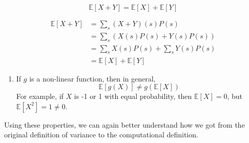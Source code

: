 \documentclass[
  letterpaper,
  DIV=11,
  numbers=noendperiod]{scrreprt}
\providecommand{\tightlist}{%
  \setlength{\itemsep}{0pt}\setlength{\parskip}{0pt}}\usepackage{longtable,booktabs,array}
\begin{document}
\[\mathbb{E}[X+Y] = \mathbb{E}[X] + \mathbb{E}[Y]\]

\begin{tcolorbox}[enhanced jigsaw, colback=white, arc=.35mm, toprule=.15mm, colframe=quarto-callout-tip-color-frame, coltitle=black, opacitybacktitle=0.6, breakable, titlerule=0mm, leftrule=.75mm, left=2mm, opacityback=0, bottomtitle=1mm, rightrule=.15mm, colbacktitle=quarto-callout-tip-color!10!white, bottomrule=.15mm, title=\textcolor{quarto-callout-tip-color}{\faLightbulb}\hspace{0.5em}{Proof}, toptitle=1mm]

\[\begin{align}
    \mathbb{E}[X+Y] &= \sum_{s} (X+Y)(s) P(s) \\
    &= \sum_{s} (X(s)P(s) + Y(s)P(s)) \\
    &= \sum_{s} X(s)P(s) + \sum_{s} Y(s)P(s)\\
    &= \mathbb{E}[X] + \mathbb{E}[Y]
\end{align}\]

\end{tcolorbox}

\begin{enumerate}
\def\labelenumi{\arabic{enumi}.}
\setcounter{enumi}{2}
\tightlist
\item
  If \(g\) is a non-linear function, then in general,
  \[\mathbb{E}[g(X)] \neq g(\mathbb{E}[X])\] For example, if \(X\) is -1
  or 1 with equal probability, then \(\mathbb{E}[X] = 0\), but
  \(\mathbb{E}[X^2] = 1 \neq 0\).
\end{enumerate}

Using these properties, we can again better understand how we got from
the original definition of variance to the computational definition.
\end{document}
